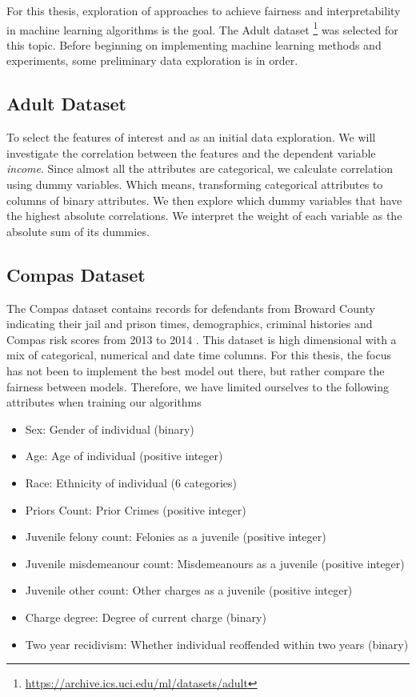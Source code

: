 For this thesis, exploration of approaches to achieve fairness and interpretability in machine learning algorithms is the goal. The Adult dataset \footnote{\url{https://archive.ics.uci.edu/ml/datasets/adult}} was selected for this topic. Before beginning on implementing machine learning methods and experiments, some preliminary data exploration is in order.

\subsection{Adult Dataset}

To select the features of interest and as an initial data exploration. We will investigate the correlation between the features and the dependent variable \emph{income}. Since almost all the attributes are categorical, we calculate correlation using dummy variables. Which means, transforming categorical attributes to columns of binary attributes. We then explore which dummy variables that have the highest absolute correlations. We interpret the weight of each variable as the absolute sum of its dummies. 

\subsection{Compas Dataset}
The Compas dataset contains records for defendants from Broward County indicating their jail and prison times, demographics, criminal histories and Compas risk scores from 2013 to 2014 \cite{Mehrabi:2021:CSUR}. This dataset is high dimensional with a mix of categorical, numerical and date time columns. For this thesis, the focus has not been to implement the best model out there, but rather compare the fairness between models. Therefore, we have limited ourselves to the following attributes when training our algorithms

\begin{itemize}
    \item Sex: Gender of individual (binary)
    \item Age: Age of individual (positive integer)
    \item Race: Ethnicity of individual (6 categories)
    \item Priors Count: Prior Crimes (positive integer)
    \item Juvenile felony count: Felonies as a juvenile (positive integer)
    \item Juvenile misdemeanour count: Misdemeanours as a juvenile (positive integer)
    \item Juvenile other count: Other charges as a juvenile (positive integer)
    \item Charge degree: Degree of current charge (binary)
    \item Two year recidivism: Whether individual reoffended within two years (binary)
\end{itemize}

